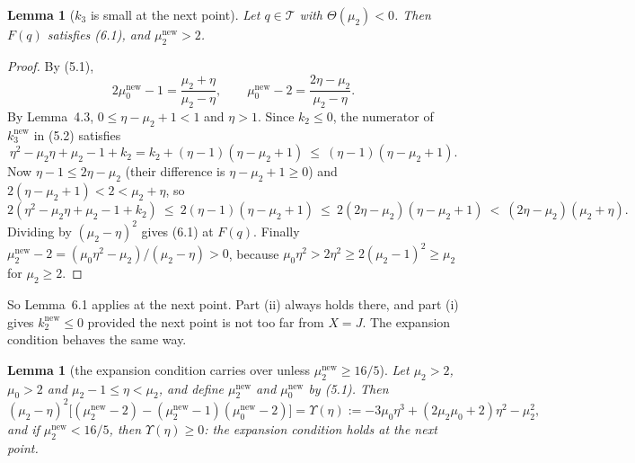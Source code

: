 \documentclass[11pt,a4paper]{article}
\theoremstyle{plain}
\newtheorem{lemma}[theorem]{Lemma}
\theoremstyle{definition}
\theoremstyle{remark}
\newcommand{\T}{\mathcal{T}}
\newcommand{\nw}{^{\mathrm{new}}}
\begin{document}
\begin{lemma}[$k_3$ is small at the next point]
Let $q\in\T$ with $\Theta(\mu_2)<0$. Then $F(q)$ satisfies \textup{(6.1)}, and $\mu_2\nw>2$.
\end{lemma}

\begin{proof}
By (5.1),
\[
2\mu_0\nw-1=\frac{\mu_2+\eta}{\mu_2-\eta},\qquad \mu_0\nw-2=\frac{2\eta-\mu_2}{\mu_2-\eta}.
\]
By Lemma~4.3, $0\le\eta-\mu_2+1<1$ and $\eta>1$. Since $k_2\le0$, the numerator of $k_3\nw$ in
(5.2) satisfies
\[
\eta^2-\mu_2\eta+\mu_2-1+k_2=k_2+(\eta-1)(\eta-\mu_2+1)\ \le\ (\eta-1)(\eta-\mu_2+1).
\]
Now $\eta-1\le2\eta-\mu_2$ (their difference is $\eta-\mu_2+1\ge0$) and
$2(\eta-\mu_2+1)<2<\mu_2+\eta$, so
\[
2(\eta^2-\mu_2\eta+\mu_2-1+k_2)\ \le\ 2(\eta-1)(\eta-\mu_2+1)\ \le\ 2(2\eta-\mu_2)(\eta-\mu_2+1)
\ <\ (2\eta-\mu_2)(\mu_2+\eta).
\]
Dividing by $(\mu_2-\eta)^2$ gives (6.1) at $F(q)$. Finally
$\mu_2\nw-2=(\mu_0\eta^2-\mu_2)/(\mu_2-\eta)>0$, because
$\mu_0\eta^2>2\eta^2\ge2(\mu_2-1)^2\ge\mu_2$ for $\mu_2\ge2$.
\end{proof}

So Lemma~6.1 applies at the next point. Part (ii) always holds there, and part (i) gives
$k_2\nw\le0$ provided the next point is not too far from $X=J$. The expansion condition behaves the
same way.

\begin{lemma}[the expansion condition carries over unless $\mu_2\nw\ge16/5$]
Let $\mu_2>2$, $\mu_0>2$ and $\mu_2-1\le\eta<\mu_2$, and define $\mu_2\nw$ and $\mu_0\nw$ by
\textup{(5.1)}. Then
\[
(\mu_2-\eta)^2\bigl[(\mu_2\nw-2)-(\mu_2\nw-1)(\mu_0\nw-2)\bigr]
=\Upsilon(\eta):=-3\mu_0\eta^3+(2\mu_2\mu_0+2)\eta^2-\mu_2^2,
\]
and if $\mu_2\nw<16/5$, then $\Upsilon(\eta)\ge0$: the expansion condition holds at the next
point.
\end{lemma}
\end{document}
